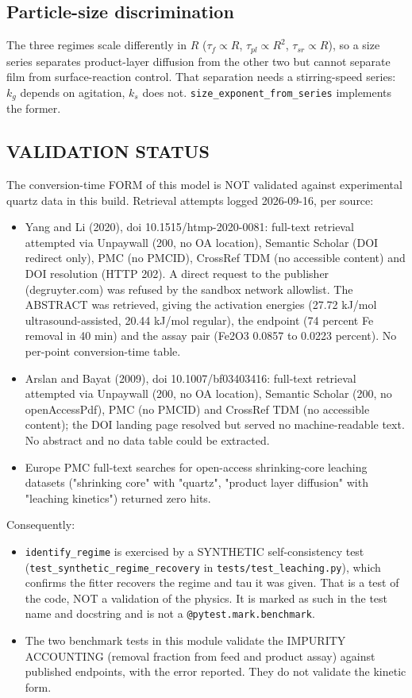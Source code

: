 \documentclass[10pt,a4paper,twoside]{report}
\begin{document}
\subsection*{Particle-size discrimination}

The three regimes scale differently in $R$ ($\tau_f \propto R$, $\tau_{pl} \propto R^2$, $\tau_{sr} \propto R$), so a size series separates product-layer diffusion from the other two but cannot separate film from surface-reaction control. That separation needs a stirring-speed series: $k_g$ depends on agitation, $k_s$ does not. \texttt{size\_exponent\_from\_series} implements the former.

\subsection*{VALIDATION STATUS}

The conversion-time FORM of this model is NOT validated against experimental quartz data in this build. Retrieval attempts logged 2026-09-16, per source:

\begin{itemize}
\item Yang and Li (2020), doi 10.1515/htmp-2020-0081: full-text retrieval attempted via Unpaywall (200, no OA location), Semantic Scholar (DOI redirect only), PMC (no PMCID), CrossRef TDM (no accessible content) and DOI resolution (HTTP 202). A direct request to the publisher (degruyter.com) was refused by the sandbox network allowlist. The ABSTRACT was retrieved, giving the activation energies (27.72 kJ/mol ultrasound-assisted, 20.44 kJ/mol regular), the endpoint (74 percent Fe removal in 40 min) and the assay pair (Fe2O3 0.0857 to 0.0223 percent). No per-point conversion-time table.
\item Arslan and Bayat (2009), doi 10.1007/bf03403416: full-text retrieval attempted via Unpaywall (200, no OA location), Semantic Scholar (200, no openAccessPdf), PMC (no PMCID) and CrossRef TDM (no accessible content); the DOI landing page resolved but served no machine-readable text. No abstract and no data table could be extracted.
\item Europe PMC full-text searches for open-access shrinking-core leaching datasets ("shrinking core" with "quartz", "product layer diffusion" with "leaching kinetics") returned zero hits.
\end{itemize}

Consequently:

\begin{itemize}
\item \texttt{identify\_regime} is exercised by a SYNTHETIC self-consistency test (\texttt{test\_synthetic\_regime\_recovery} in \texttt{tests/test\_leaching.py}), which confirms the fitter recovers the regime and tau it was given. That is a test of the code, NOT a validation of the physics. It is marked as such in the test name and docstring and is not a \texttt{@pytest.mark.benchmark}.
\item The two benchmark tests in this module validate the IMPURITY ACCOUNTING (removal fraction from feed and product assay) against published endpoints, with the error reported. They do not validate the kinetic form.
\end{itemize}
\end{document}
